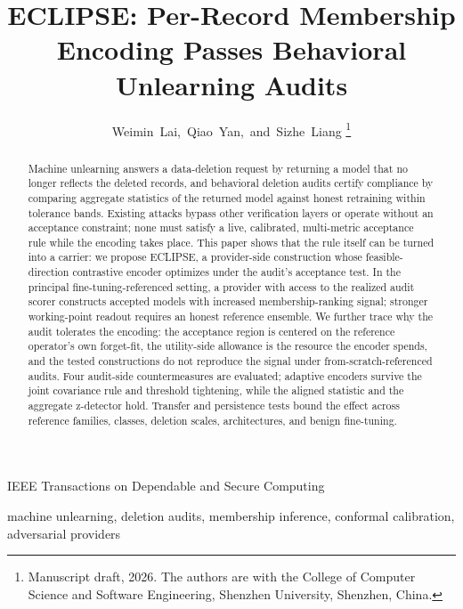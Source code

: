 \documentclass[lettersize,journal]{IEEEtran}
\begin{document}
\title{ECLIPSE: Per-Record Membership Encoding Passes Behavioral\\
 Unlearning Audits}

\author{Weimin~Lai,~Qiao~Yan,~and~Sizhe~Liang%
\thanks{Manuscript draft, 2026. The authors are with the College of
Computer Science and Software Engineering, Shenzhen University,
Shenzhen, China.}}

%
{IEEE Transactions on Dependable and Secure Computing}

\maketitle

\begin{abstract}
Machine unlearning answers a data-deletion request by
returning a model that no longer reflects the deleted
records, and behavioral deletion audits certify compliance by
comparing aggregate statistics of the returned model against
honest retraining within tolerance bands. Existing attacks
bypass other verification layers or operate without an
acceptance constraint; none must satisfy a live, calibrated,
multi-metric acceptance rule while the encoding takes place.
This paper shows that the rule itself can be turned into a
carrier: we propose ECLIPSE, a provider-side construction
whose feasible-direction contrastive encoder optimizes under
the audit's acceptance test. In the principal
fine-tuning-referenced setting, a
provider with access to the realized audit scorer constructs
accepted models with increased membership-ranking signal;
stronger working-point readout requires an honest reference
ensemble. We further trace why the audit tolerates the
encoding: the acceptance region is centered on the reference
operator's own forget-fit, the utility-side allowance is the
resource the encoder spends, and the tested constructions do
not reproduce the signal under from-scratch-referenced audits.
Four audit-side countermeasures are evaluated; adaptive
encoders survive the joint covariance rule and threshold
tightening, while the aligned statistic and the aggregate
z-detector hold. Transfer and persistence tests bound the
effect across reference families, classes, deletion scales,
architectures, and benign fine-tuning.
\end{abstract}

\begin{IEEEkeywords}
machine unlearning, deletion audits, membership inference,
conformal calibration, adversarial providers
\end{IEEEkeywords}
\end{document}
